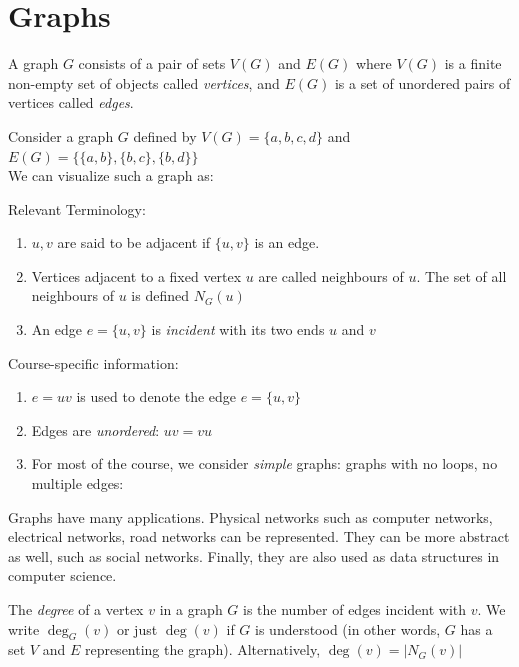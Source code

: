 \documentclass[12pt,a4paper]{article}
\begin{document}
\section{Graphs}

\begin{definition}
A graph $G$ consists of a pair of sets $V(G)$ and $E(G)$ where $V(G)$ is a finite non-empty set of objects called \textit{vertices}, and $E(G)$ is a set of unordered pairs of vertices called \textit{edges}.
\end{definition}

\begin{example}
    Consider a graph $G$ defined by $V(G) = \{ a,b,c,d\}$ and $E(G) = \{\{a,b\}, \{b,c\}, \{b,d\}\}$ \\

    We can visualize such a graph as:\\
    

    
\end{example}


Relevant Terminology:
\begin{enumerate}
    \item $u,v$ are said to be adjacent if $\{u,v\}$ is an edge.
    \item Vertices adjacent to a fixed vertex $u$ are called neighbours of $u$. The set of all neighbours of $u$ is defined $N_G(u)$
    \item An edge $e = \{u,v\}$ is \textit{incident} with its two ends $u$ and $v$
\end{enumerate}

Course-specific information:
\begin{enumerate}
    \item $e=uv$ is used to denote the edge $e = \{u,v\}$
    \item Edges are \textit{unordered}: $uv = vu$
    \item For most of the course, we consider \textit{simple} graphs: graphs with no loops, no multiple edges:

    
\end{enumerate}

Graphs have many applications. Physical networks such as computer networks, electrical networks, road networks can be represented. They can be more abstract as well, such as social networks. Finally, they are also used as data structures in computer science.

\begin{definition}
    The \textit{degree} of a vertex $v$ in a graph $G$ is the number of edges incident with $v$. We write $\deg_G(v)$ or just $\deg(v)$ if $G$ is understood (in other words, $G$ has a set $V$ and $E$ representing the graph). Alternatively, $\deg(v) = \lvert N_G(v)\rvert$\\
\end{definition}
\end{document}
